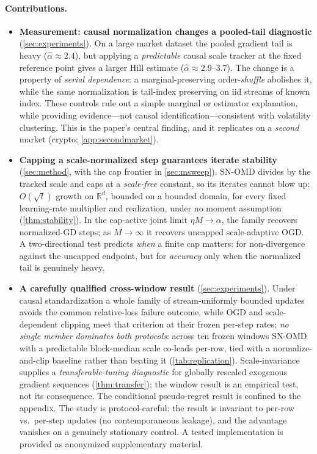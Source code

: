 \documentclass{article}
\newcommand{\R}{\mathbb{R}}
\begin{document}
\paragraph{Contributions.}
\begin{itemize}
  \item \textbf{Measurement: causal normalization changes a pooled-tail diagnostic} (\cref{sec:experiments}).
  On a large market dataset the pooled gradient tail is heavy
  ($\hat\alpha\approx2.4$), but applying a \emph{predictable} causal scale tracker at the fixed
  reference point gives a larger Hill estimate ($\hat\alpha\approx2.9$--$3.7$). The change is a property of
  \emph{serial dependence}: a marginal-preserving order-\emph{shuffle} abolishes it, while the
  same normalization is tail-index preserving on iid streams of known index. These controls
  rule out a simple marginal or estimator explanation, while providing evidence---not causal
  identification---consistent with volatility clustering. This is the paper's central finding,
  and it replicates on a \emph{second} market
  (crypto; \cref{app:secondmarket}).

  \item \textbf{Capping a scale-normalized step guarantees iterate stability}
  (\cref{sec:method}, with the cap frontier in \cref{sec:msweep}). SN-OMD divides by the
  tracked scale and caps at a
  \emph{scale-free} constant, so its iterates cannot blow up: $O(\sqrt t)$ growth on $\R^d$,
  bounded on a bounded domain, for every fixed learning-rate multiplier and realization, under
  no moment assumption (\cref{thm:stability}). In the cap-active joint limit
  $\eta M\to\alpha$, the family recovers normalized-GD steps; as $M\!\to\!\infty$ it recovers
  uncapped scale-adaptive OGD. A
  two-directional test predicts \emph{when} a finite cap matters: for non-divergence against
  the uncapped endpoint, but for \emph{accuracy} only when the normalized tail is genuinely
  heavy.

  \item \textbf{A carefully qualified cross-window result} (\cref{sec:experiments}). Under causal standardization a whole family of
  stream-uniformly bounded updates avoids the common relative-loss failure outcome, while OGD and
  scale-dependent clipping meet that criterion at their frozen per-step rates; \emph{no single member dominates both protocols}: across ten frozen windows
  SN-OMD with a predictable block-median scale co-leads per-row, tied with a normalize-and-clip
  baseline rather than beating it (\cref{tab:replication}). Scale-invariance supplies a
  \emph{transferable-tuning diagnostic} for globally rescaled exogenous gradient sequences
  (\cref{thm:transfer}); the window result is an empirical test, not its consequence. The
  conditional pseudo-regret result is confined to the appendix. The study is protocol-careful: the result is invariant to
  per-row vs.\ per-step updates (no contemporaneous leakage), and the advantage vanishes on
  a genuinely stationary control. A tested implementation is provided as anonymized
  supplementary material.
\end{itemize}
\end{document}
